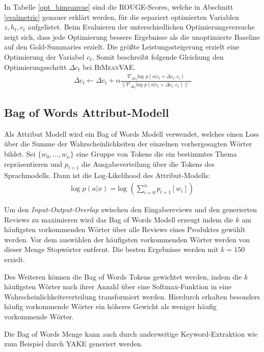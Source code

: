 In Tabelle \ref{opt_bimeanvae} sind die ROUGE-Scores, welche in Abschnitt \ref{evalmetric} genauer erklärt werden, für die separiert optimierten Variablen $z, h_t, c_t$ aufgelistet.
Beim Evaluieren der unterschiedlichen Optimierungsversuche zeigt sich, dass jede Optimierung bessere Ergebnisse als die unoptimierte Baseline auf den Gold-Summaries erzielt.
Die größte Leistungssteigerung erzielt eine Optimierung der Variabel $c_t$.
Somit beschreibt folgende Gleichung den Optimierungsschritt $\Delta c_t$ bei \textsc{BiMeanVAE}.
\begin{align*}
    \Delta c_t \leftarrow \Delta c_t + \alpha \frac{\nabla_{\Delta c_t} \text{log }p(a|c_t+\Delta c_t,c_t)}{\| \nabla_{\Delta c_t} \text{log }p(a|c_t +\Delta c_t ,c_t )\|^\gamma}
\end{align*}


\subsection{Bag of Words Attribut-Modell}
Als Attribut Modell wird ein Bag of Words Modell verwendet, welches einen Loss über die Summe der Wahrscheinlichkeiten der einzelnen vorhergesagten Wörter bildet.
Sei $\{w_0, \ldots, w_n\}$ eine Gruppe von Tokens die ein bestimmtes Thema repräsentieren und $p_{t+1}$ die Ausgabeverteilung über die Tokens des Sprachmodells.
Dann ist die Log-Likelihood des Attribut-Modells: 
\begin{align*}
    \text{log }p(a|x) = \text{log }(\sum_{i=0}^n p_{t+1}[w_i])
\end{align*}

Um den \textit{Input-Output-Overlap} zwischen den Eingabereviews und den generierten Reviews zu maximieren wird das Bag of Words Modell erzeugt indem die $k$ am häufigsten vorkommenden Wörter über alle Reviews eines Produktes gewählt werden.
Vor dem auswählen der häufigsten vorkommenden Wörter werden von dieser Menge Stopwörter entfernt.
Die besten Ergebnisse werden mit $k=150$ erzielt. %

Des Weiteren können die Bag of Words Tokens gewichtet werden, indem die $k$ häufigsten Wörter nach ihrer Anzahl über eine Softmax-Funktion in eine Wahrscheinlichkeitsverteilung transformiert werden.
Hierdurch erhalten besonders häufig vorkommende Wörter ein höheres Gewicht als weniger häufig vorkommende Wörter.

Die Bag of Words Menge kann auch durch anderweitige Keyword-Extraktion wie zum Beispiel durch YAKE \citep{CAMPOS2020257} generiert werden.



